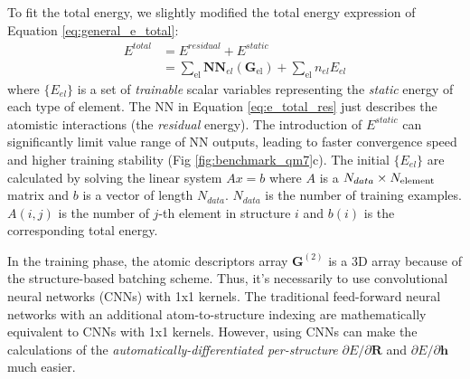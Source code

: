 \documentclass[final,1p,times]{elsarticle}
\begin{document}
To fit the total energy, we slightly modified the total energy expression of 
Equation \ref{eq:general_e_total}:
\begin{align}
\label{eq:e_total_res}
E^{total} & = E^{residual} + E^{static} \nonumber \\
& = \sum_{\mathrm{el}}{\mathbf{NN}_{el}\left(\mathbf{G}_{\mathrm{el}}\right)}
+ \sum_{\mathrm{el}}{n_{el}E_{el}}
\end{align}
where $\{E_{el}\}$ is a set of \textit{trainable} scalar variables representing 
the \textit{static} energy of each type of element\cite{kCON}. The NN in 
Equation \ref{eq:e_total_res} just describes the atomistic interactions 
(the \textit{residual} energy). 
The introduction of $E^{static}$ can significantly limit value range of NN 
outputs, leading to faster convergence speed and higher training stability 
(Fig \ref{fig:benchmark_qm7}c). The initial $\{E_{el}\}$ are calculated by 
solving the linear system $Ax=b$ where $A$ is a $N_{data} \times N_{\mathrm{element}}$ matrix 
and $b$ is a vector of length $N_{data}$. $N_{data}$ is the number of training 
examples. $A(i,j)$ is the number of $j$-th element in structure $i$ and $b(i)$ 
is the corresponding total energy.

In the training phase, the atomic descriptors array $\mathbf{G}^{(2)}$ is a 3D 
array because of the structure-based batching scheme. Thus, it's necessarily to 
use convolutional neural networks (CNNs) with 1x1 kernels\cite{kCON}. 
The traditional feed-forward neural networks with an additional 
atom-to-structure indexing\cite{Behler,ANI,TensorMol,DeePMD,BIMNN} are 
mathematically equivalent to CNNs with 1x1 kernels. However, using CNNs can make
the calculations of the \textit{automatically-differentiated per-structure} 
$\partial E/\partial \mathbf{R}$ and $\partial E/\partial \mathbf{h}$ much 
easier.
\end{document}
